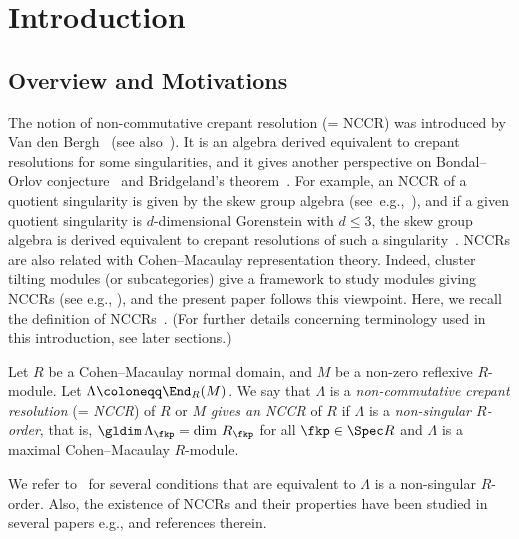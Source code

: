 \section{Introduction}

\subsection{Overview and Motivations}

The notion of non-commutative crepant resolution (= NCCR) was introduced by Van den Bergh~\cite{VdB2} (see also~\cite{VdB1}). It is an algebra derived equivalent to crepant resolutions for some singularities, and it gives another perspective on Bondal--Orlov conjecture~\cite{BO} and Bridgeland's theorem~\cite{Bri}. For example, an NCCR of a quotient singularity is given by the skew group algebra (see~e.g.,~\cite{Iya,IW2,VdB2}), and if a given quotient singularity is $d$-dimensional Gorenstein with $d\le 3$, the skew group algebra is derived equivalent to crepant resolutions of such a singularity~\cite{BKR,KV}. NCCRs are also related with Cohen--Macaulay representation theory. Indeed, cluster tilting modules (or subcategories) give a framework to study modules giving NCCRs (see e.g., \cite{DH,Iya,IR,IW2,IW4}), and the present paper follows this viewpoint. Here, we recall the definition of NCCRs~\cite{VdB2}. (For further details concerning terminology used in this introduction, see later sections.)

\begin{defi}\label{NCCR_def}
Let $R$ be a Cohen--Macaulay normal domain, and $M$ be a non-zero reflexive $R$-module. Let $\Lambda\coloneqq\End_R(M)$. We say that $\Lambda$ is a \emph{non-commutative crepant resolution} (= \emph{NCCR}) of $R$ or $M$ \emph{gives an NCCR} of $R$ if $\Lambda$ is a \emph{non-singular $R$-order}, that is, $\gldim\,\Lambda_\fkp=\dim\,R_\fkp$ for all $\fkp\in\Spec R$ and $\Lambda$ is a maximal Cohen--Macaulay $R$-module.
\end{defi}

We refer to~\cite[Proposition~2.17]{IW2} for several conditions that are equivalent to $\Lambda$ is a non-singular $R$-order. Also, the existence of NCCRs and their properties have been studied in several papers e.g., \cite{Bro,BLVdB,BIKR,Dao,DFI,HN,IU2,IW1,IW2,IW4,Leu2,SpVdB,Wem} and references therein.


